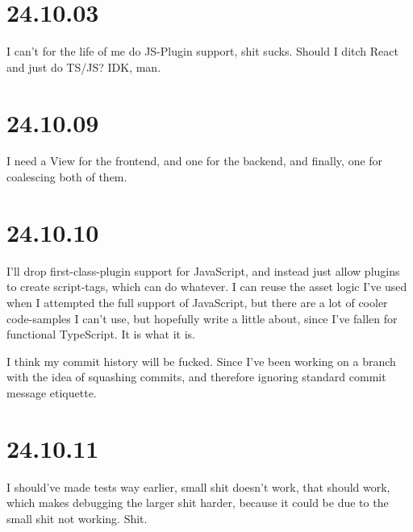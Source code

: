 \section{24.10.03}

I can't for the life of me do JS-Plugin support, shit sucks.
Should I ditch React and just do TS/JS? IDK, man.


\section{24.10.09}

I need a View for the frontend, and one for the backend, and finally, one for
coalescing both of them.


\section{24.10.10}

I'll drop first-class-plugin support for JavaScript, and instead just allow
plugins to create script-tags, which can do whatever. I can reuse the asset
logic I've used when I attempted the full support of JavaScript, but there are
a lot of cooler code-samples I can't use, but hopefully write a little about,
since I've fallen for functional TypeScript. It is what it is.

I think my commit history will be fucked. Since I've been working on a branch
with the idea of squashing commits, and therefore ignoring standard commit
message etiquette.


\section{24.10.11}

I should've made tests way earlier, small shit doesn't work, that should work,
which makes debugging the larger shit harder, because it could be due to the
small shit not working. Shit.
